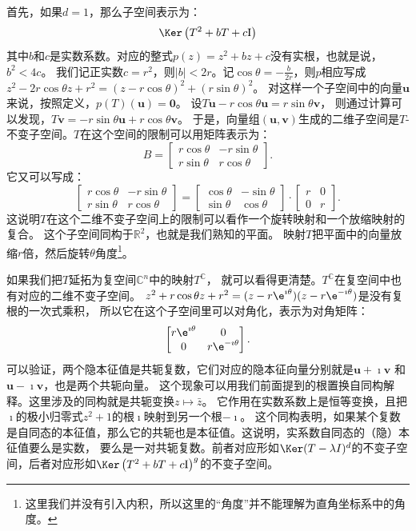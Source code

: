 \documentclass[12pt,UTF8]{ctexbook}
\begin{document}
首先，如果$d = 1$，那么子空间表示为：
$$ \Ker \left(T^2 + bT + c\mathrm{I}\right) $$
其中$b$和$c$是实数系数。对应的整式$p(z) = z^2 + bz + c$没有实根，也就是说，$b^2 < 4c$。
我们记正实数$c = r^2$，则$|b| < 2r$。记$\cos\theta = -\frac{b}{2r}$，则$p$相应写成$z^2 - 2r\cos\theta z + r^2 = (z - r\cos\theta)^2 + (r\sin\theta)^2$。
对这样一个子空间中的向量$\mathbf{u}$来说，按照定义，$p(T)(\mathbf{u}) = \mathbf{0}$。
设$T\mathbf{u} - r\cos\theta \mathbf{u} = r\sin\theta \mathbf{v}$，
则通过计算可以发现，$T\mathbf{v} = -r\sin\theta \mathbf{u} + r\cos\theta \mathbf{v}$。
于是，向量组$(\mathbf{u}, \mathbf{v})$生成的二维子空间是$T$-不变子空间。$T$在这个空间的限制可以用矩阵表示为：
$$ B = \begin{bmatrix}
    r\cos\theta & -r\sin\theta \\ r\sin\theta & r\cos\theta
\end{bmatrix}.$$
它又可以写成：
$$ \begin{bmatrix}
    r\cos\theta & -r\sin\theta \\ r\sin\theta & r\cos\theta
\end{bmatrix} = \begin{bmatrix}
    \cos\theta & -\sin\theta \\ \sin\theta & \cos\theta
\end{bmatrix} \cdot \begin{bmatrix}
    r & 0 \\ 0 & r
\end{bmatrix}.$$
这说明$T$在这个二维不变子空间上的限制可以看作一个旋转映射和一个放缩映射的复合。
这个子空间同构于$\mathbb{R}^2$，也就是我们熟知的平面。
映射$T$把平面中的向量放缩$r$倍，然后旋转$\theta$角度\footnote{这里我们并没有引入内积，所以这里的“角度”并不能理解为直角坐标系中的角度。}。

如果我们把$T$延拓为复空间$\mathbb{C}^n$中的映射$T^\mathbb{C}$，
就可以看得更清楚。$T^\mathbb{C}$在复空间中也有对应的二维不变子空间。
$z^2 + r\cos\theta z + r^2 = (z - r\e^{\imath \theta})(z - r\e^{-\imath \theta})$是没有复根的一次式乘积，
所以它在这个子空间里可以对角化，表示为对角矩阵：
$$ \begin{bmatrix}
    r\e^{\imath \theta} & 0 \\ 0 & r\e^{-\imath \theta}
\end{bmatrix}.$$
可以验证，两个隐本征值是共轭复数，它们对应的隐本征向量分别就是$\mathbf{u}+\imath \mathbf{v}$
和$\mathbf{u}-\imath \mathbf{v}$，也是两个共轭向量。
这个现象可以用我们前面提到的根置换自同构解释。这里涉及的同构就是共轭变换$z \mapsto \bar{z}$。
它作用在实数系数上是恒等变换，且把$\imath $的极小归零式$z^2+1$的根$\imath $映射到另一个根$-\imath $。
这个同构表明，如果某个复数是自同态的本征值，那么它的共轭也是本征值。这说明，实系数自同态的（隐）本征值要么是实数，
要么是一对共轭复数。前者对应形如$\Ker (T - \lambda I)^{d}$的不变子空间，后者对应形如$\Ker \left(T^2 + b T + c\mathrm{I}\right)^{g}$的不变子空间。
\end{document}
